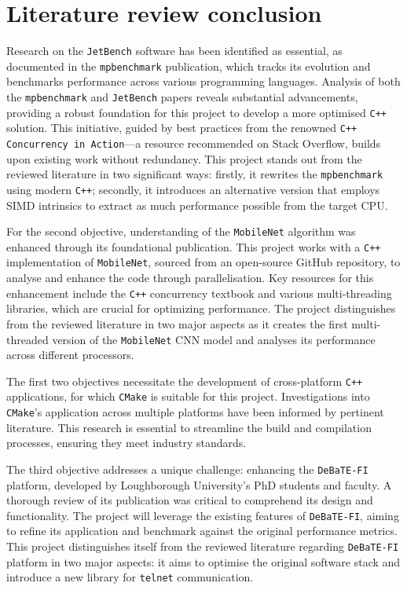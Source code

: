 \section{Literature review conclusion}

Research on the \texttt{JetBench} software has been identified as essential, as documented in the \texttt{mpbenchmark} publication\cite{mpbenchmark_paper}, which tracks its evolution and benchmarks performance across various programming languages. Analysis of both the \texttt{mpbenchmark} and \texttt{JetBench} papers\cite{JetBench_paper}\cite{mpbenchmark_paper} reveals substantial advancements, providing a robust foundation for this project to develop a more optimised \texttt{C++} solution. This initiative, guided by best practices from the renowned \texttt{C++ Concurrency in Action}\cite{c++_concurrency_in_action}—a resource recommended on Stack Overflow\cite{c++_books_stackoverflow}, builds upon existing work without redundancy. This project stands out from the reviewed literature in two significant ways: firstly, it rewrites the \texttt{mpbenchmark} using modern \texttt{C++}; secondly, it introduces an alternative version that employs SIMD intrinsics to extract as much performance possible from the target CPU.

For the second objective, understanding of the \texttt{MobileNet} algorithm was enhanced through its foundational publication\cite{mobilenet_paper}. This project works with a \texttt{C++} implementation of \texttt{MobileNet}, sourced from an open-source GitHub repository\cite{mobilenet_repo}, to analyse and enhance the code through parallelisation. Key resources for this enhancement include the \texttt{C++} concurrency textbook\cite{c++_concurrency_in_action} and various multi-threading libraries\cite{openmp_usage_hpc}, which are crucial for optimizing performance. The project distinguishes from the reviewed literature in two major aspects as it creates the first multi-threaded version of the \texttt{MobileNet} CNN model and analyses its performance across different processors. 

The first two objectives necessitate the development of cross-platform \texttt{C++} applications, for which \texttt{CMake} is suitable for this project. Investigations into \texttt{CMake}'s application across multiple platforms have been informed by pertinent literature\cite{cmake_publication_1}\cite{cmake_publication_2}. This research is essential to streamline the build and compilation processes, ensuring they meet industry standards.

The third objective addresses a unique challenge: enhancing the \texttt{DeBaTE-FI} platform, developed by Loughborough University’s PhD students and faculty\cite{debate_fi_publication}. A thorough review of its publication was critical to comprehend its design and functionality. The project will leverage the existing features of \texttt{DeBaTE-FI}, aiming to refine its application and benchmark against the original performance metrics. This project distinguishes itself from the reviewed literature regarding \texttt{DeBaTE-FI} platform in two major aspects: it aims to optimise the original software stack and introduce a new library for \texttt{telnet} communication.



